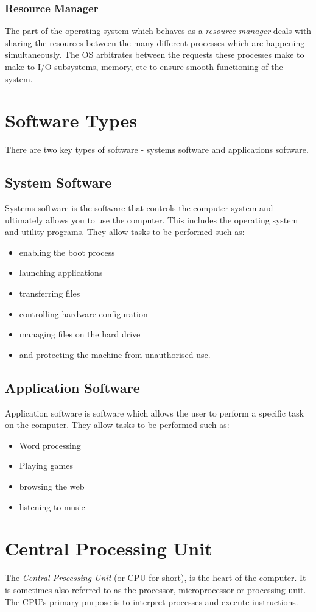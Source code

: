 \subsubsection{Resource Manager}
The part of the operating system which behaves as a \textit{resource manager} deals with sharing the resources between the many different processes which are happening simultaneously. The OS arbitrates between the requests these processes make to make to I/O subsystems, memory, etc to ensure smooth functioning of the system.

\section{Software Types}
There are two key types of software - systems software and applications software.
\subsection{System Software}
Systems software is the software that controls the computer system and ultimately allows you to use the computer. This includes the operating system and utility programs. They allow tasks to be performed such as:
\begin{itemize}
    \item enabling the boot process
    \item launching applications
    \item transferring files
    \item controlling hardware configuration
    \item managing files on the hard drive
    \item and protecting the machine from unauthorised use.
\end{itemize}
\subsection{Application Software}
Application software is software which allows the user to perform a specific task on the computer. They allow tasks to be performed such as:
\begin{itemize}
    \item Word processing
    \item Playing games
    \item browsing the web
    \item listening to music
\end{itemize}

\section{Central Processing Unit}
The \textit{Central Processing Unit} (or CPU for short), is the heart of the computer. It is sometimes also referred to as the processor, microprocessor or processing unit. The CPU's primary purpose is to interpret processes and execute instructions. 
